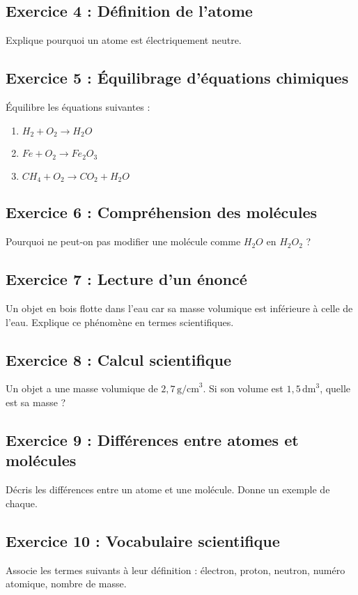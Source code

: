 \documentclass[a4paper,12pt]{article}
\begin{document}
\subsection*{Exercice 4 : Définition de l'atome}
Explique pourquoi un atome est électriquement neutre.

\subsection*{Exercice 5 : Équilibrage d'équations chimiques}
Équilibre les équations suivantes :
\begin{enumerate}
    \item \( H_2 + O_2 \rightarrow H_2O \)
    \item \( Fe + O_2 \rightarrow Fe_2O_3 \)
    \item \( CH_4 + O_2 \rightarrow CO_2 + H_2O \)
\end{enumerate}

\subsection*{Exercice 6 : Compréhension des molécules}
Pourquoi ne peut-on pas modifier une molécule comme \( H_2O \) en \( H_2O_2 \) ?

\subsection*{Exercice 7 : Lecture d'un énoncé}
Un objet en bois flotte dans l'eau car sa masse volumique est inférieure à celle de l'eau. Explique ce phénomène en termes scientifiques.

\subsection*{Exercice 8 : Calcul scientifique}
Un objet a une masse volumique de \( 2,7 \, \text{g/cm}^3 \). Si son volume est \( 1,5 \, \text{dm}^3 \), quelle est sa masse ?

\subsection*{Exercice 9 : Différences entre atomes et molécules}
Décris les différences entre un atome et une molécule. Donne un exemple de chaque.

\subsection*{Exercice 10 : Vocabulaire scientifique}
Associe les termes suivants à leur définition : électron, proton, neutron, numéro atomique, nombre de masse.
\end{document}
